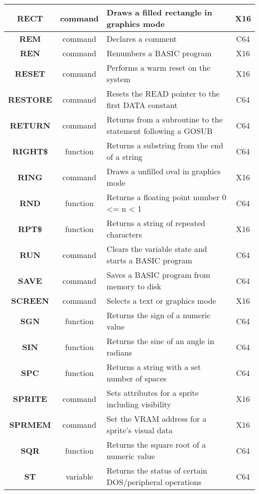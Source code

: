 \begin{longtable}{|c|c|m{4cm}|c|}
	{\bfseries RECT} & command & Draws a filled rectangle in graphics mode & X16 \\ \hline
	{\bfseries REM} & command & Declares a comment & C64 \\ \hline
	{\bfseries REN} & command & Renumbers a BASIC program & X16 \\ \hline
	{\bfseries RESET} & command & Performs a warm reset on the system & X16 \\ \hline
	{\bfseries RESTORE} & command & Resets the {\ttfamily READ} pointer to the first {\ttfamily DATA} constant & C64 \\ \hline
	{\bfseries RETURN} & command & Returns from a subroutine to the statement following a GOSUB & C64 \\ \hline
	{\bfseries RIGHT\$} & function & Returns a substring from the end of a string & C64 \\ \hline
	{\bfseries RING} & command & Draws a unfilled oval in graphics mode & X16 \\ \hline
	{\bfseries RND} & function & Returns a floating point number 0 <= n < 1 & C64 \\ \hline
	{\bfseries RPT\$} & function & Returns a string of repeated characters & X16 \\ \hline
	{\bfseries RUN} & command & Clears the variable state and starts a BASIC program & C64 \\ \hline
	{\bfseries SAVE} & command & Saves a BASIC program from memory to disk & C64 \\ \hline
	{\bfseries SCREEN} & command & Selects a text or graphics mode & X16 \\ \hline
	{\bfseries SGN} & function & Returns the sign of a numeric value & C64 \\ \hline
	{\bfseries SIN} & function & Returns the sine of an angle in radians & C64 \\ \hline
	{\bfseries SPC} & function & Returns a string with a set number of spaces & C64 \\ \hline
	{\bfseries SPRITE} & command & Sets attributes for a sprite including visibility & X16 \\ \hline
	{\bfseries SPRMEM} & command & Set the VRAM address for a sprite's visual data & X16 \\ \hline
	{\bfseries SQR} & function & Returns the square root of a numeric value & C64 \\ \hline
	{\bfseries ST} & variable & Returns the status of certain DOS/peripheral operations & C64 \\ \hline

\end{longtable}
